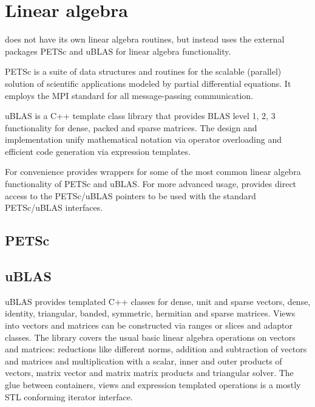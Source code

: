\chapter{Linear algebra}


\dolfin{} does not have its own linear algebra routines,
but instead uses the external packages PETSc \cite{www:petsc}
and uBLAS \cite{www:ublas} for linear algebra functionality.

PETSc is a suite of data structures and routines for the scalable
(parallel) solution of scientific applications modeled by partial
differential equations.
It employs the MPI standard for all message-passing communication.

uBLAS is a C++ template class library that provides BLAS level 1, 2, 3
functionality for dense, packed and sparse matrices.
The design and implementation unify mathematical notation via operator
overloading and efficient code generation via expression templates.

For convenience \dolfin{} provides wrappers for some of the most
common linear algebra functionality of PETSc and uBLAS.
For more advanced usage,
\dolfin{} provides direct access to the PETSc/uBLAS pointers
to be used with the standard PETSc/uBLAS interfaces.


\section{PETSc}

\section{uBLAS}

uBLAS provides templated C++ classes for dense, unit and sparse vectors,
dense, identity, triangular, banded, symmetric, hermitian and sparse matrices. 
Views into vectors and matrices can be constructed via ranges or slices and 
adaptor classes. The library covers the usual basic linear algebra operations on
vectors and matrices: reductions like different norms, addition and subtraction 
of vectors and matrices and multiplication with a scalar, inner and outer 
products of vectors, matrix vector and matrix matrix products and triangular 
solver. The glue between containers, views and expression templated operations 
is a mostly STL conforming iterator interface.



